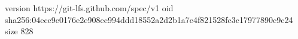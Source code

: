 version https://git-lfs.github.com/spec/v1
oid sha256:04ece9e0176e2e908ec994ddd18552a2d2b1a7e4f821528fc3c17977890c9c24
size 828
